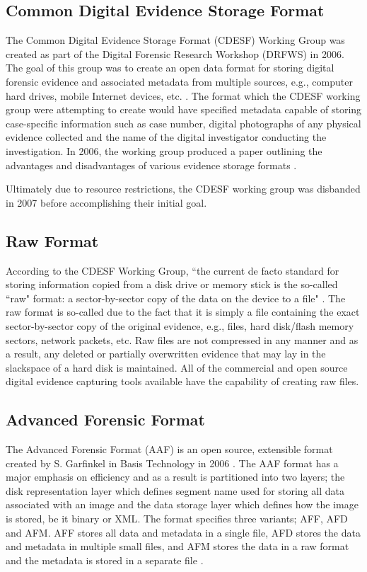 \documentclass[runningheads,a4paper]{llncs}
\begin{document}
\subsection{Common Digital Evidence Storage Format}
\label{ch2:cdesf}

The Common Digital Evidence Storage Format (CDESF) Working Group was created as part of the Digital Forensic Research Workshop (DRFWS) in 2006. The goal of this group was to create an open data format for storing digital forensic evidence and associated metadata from multiple sources, e.g., computer hard drives, mobile Internet devices, etc. \cite{cdesf}. The format which the CDESF working group were attempting to create would have specified metadata capable of storing case-specific information such as case number, digital photographs of any physical evidence collected and the name of the digital investigator conducting the investigation. In 2006, the working group produced a paper outlining the advantages and disadvantages of various evidence storage formats \cite{dfrws2006}.

Ultimately due to resource restrictions, the CDESF working group was disbanded in 2007 before accomplishing their initial goal.

\subsection{Raw Format}
\label{ch2:raw}

According to the CDESF Working Group, ``the current de facto standard for storing information copied from a disk drive or memory stick is the so-called ``raw" format: a sector-by-sector copy of the data on the device to a file" \cite{evidencestandards}. The raw format is so-called due to the fact that it is simply a file containing the exact sector-by-sector copy of the original evidence, e.g., files, hard disk/flash memory sectors, network packets, etc. Raw files are not compressed in any manner and as a result, any deleted or partially overwritten evidence that may lay in the slackspace of a hard disk is maintained. All of the commercial and open source digital evidence capturing tools available have the capability of creating raw files.

\subsection{Advanced Forensic Format}
\label{ch2:aaf}

The Advanced Forensic Format (AAF) is an open source, extensible format created by S. Garfinkel in Basis Technology in 2006 \cite{aaf}. The AAF format has a major emphasis on efficiency and as a result is partitioned into two layers; the disk representation layer which defines segment name used for storing all data associated with an image and the data storage layer which defines how the image is stored, be it binary or XML\cite{containers}. The format specifies three variants; AFF, AFD and AFM. AFF stores all data and metadata in a single file, AFD stores the data and metadata in multiple small files, and AFM stores the data in a raw format and the metadata is stored in a separate file \cite{containers}.
\end{document}
